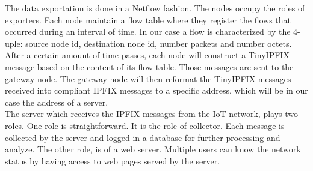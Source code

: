 The data exportation is done in a Netflow fashion. The nodes occupy the roles of exporters. Each node maintain a flow table where they register the flows that occurred during an interval of time. In our case a flow is characterized by the 4-uple: source node id, destination node id, number packets and number octets. After a certain amount of time passes, each node will construct a TinyIPFIX message based on the content of its flow table. Those messages are sent to the gateway node. The gateway node will then reformat the TinyIPFIX messages received into compliant IPFIX messages to a specific address, which will be in our case the address of a server.\\

The server which receives the IPFIX messages from the IoT network, plays two roles. One role is straightforward. It is the role of collector. Each message is collected by the server and logged in a database for further processing and analyze. The other role, is of a web server. Multiple users can know the network status by having access to web pages served by the server.
